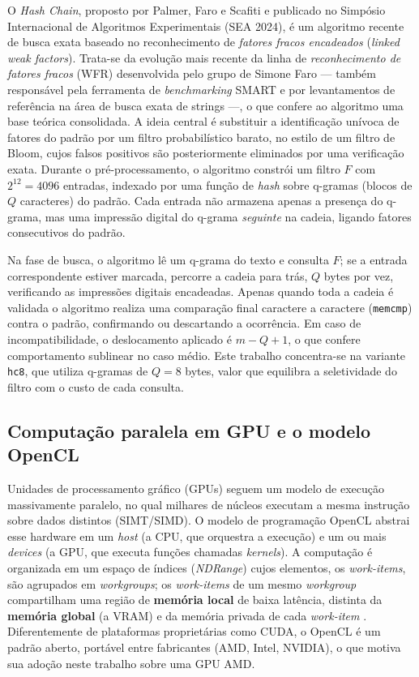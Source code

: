 \documentclass[12pt]{article}
\begin{document}
O \textit{Hash Chain}, proposto por Palmer, Faro e Scafiti \cite{palmer2024} e publicado no Simpósio Internacional de Algoritmos Experimentais (SEA 2024), é um algoritmo recente de busca exata baseado no reconhecimento de \textit{fatores fracos encadeados} (\textit{linked weak factors}). Trata-se da evolução mais recente da linha de \textit{reconhecimento de fatores fracos} (WFR) desenvolvida pelo grupo de Simone Faro — também responsável pela ferramenta de \textit{benchmarking} SMART e por levantamentos de referência na área de busca exata de strings —, o que confere ao algoritmo uma base teórica consolidada. A ideia central é substituir a identificação unívoca de fatores do padrão por um filtro probabilístico barato, no estilo de um filtro de Bloom, cujos falsos positivos são posteriormente eliminados por uma verificação exata. Durante o pré-processamento, o algoritmo constrói um filtro $F$ com $2^{12} = 4096$ entradas, indexado por uma função de \textit{hash} sobre q-gramas (blocos de $Q$ caracteres) do padrão. Cada entrada não armazena apenas a presença do q-grama, mas uma impressão digital do q-grama \textit{seguinte} na cadeia, ligando fatores consecutivos do padrão.

Na fase de busca, o algoritmo lê um q-grama do texto e consulta $F$; se a entrada correspondente estiver marcada, percorre a cadeia para trás, $Q$ bytes por vez, verificando as impressões digitais encadeadas. Apenas quando toda a cadeia é validada o algoritmo realiza uma comparação final caractere a caractere (\texttt{memcmp}) contra o padrão, confirmando ou descartando a ocorrência. Em caso de incompatibilidade, o deslocamento aplicado é $m-Q+1$, o que confere comportamento sublinear no caso médio. Este trabalho concentra-se na variante \texttt{hc8}, que utiliza q-gramas de $Q=8$ bytes, valor que equilibra a seletividade do filtro com o custo de cada consulta.

\subsection{Computação paralela em GPU e o modelo OpenCL}

Unidades de processamento gráfico (GPUs) seguem um modelo de execução massivamente paralelo, no qual milhares de núcleos executam a mesma instrução sobre dados distintos (SIMT/SIMD). O modelo de programação OpenCL \cite{khronos2012} abstrai esse hardware em um \textit{host} (a CPU, que orquestra a execução) e um ou mais \textit{devices} (a GPU, que executa funções chamadas \textit{kernels}). A computação é organizada em um espaço de índices (\textit{NDRange}) cujos elementos, os \textit{work-items}, são agrupados em \textit{workgroups}; os \textit{work-items} de um mesmo \textit{workgroup} compartilham uma região de \textbf{memória local} de baixa latência, distinta da \textbf{memória global} (a VRAM) e da memória privada de cada \textit{work-item} \cite{kaeli2015}. Diferentemente de plataformas proprietárias como CUDA, o OpenCL é um padrão aberto, portável entre fabricantes (AMD, Intel, NVIDIA), o que motiva sua adoção neste trabalho sobre uma GPU AMD.
\end{document}
